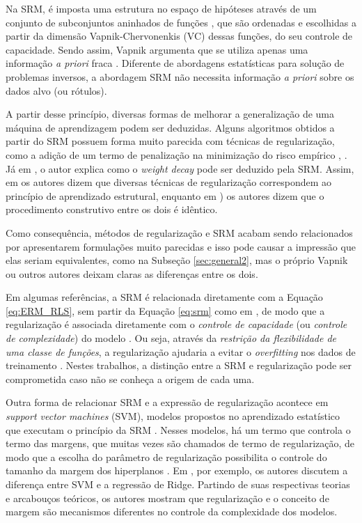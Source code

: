 Na SRM, é imposta uma estrutura no espaço de hipóteses através de um conjunto de subconjuntos aninhados de funções \cite[pág. 221]{vapnik1998statistical}, que são ordenadas e escolhidas a partir da dimensão Vapnik-Chervonenkis (VC) dessas funções, do seu controle de capacidade. Sendo assim, Vapnik argumenta que se utiliza apenas uma informação \textit{a priori} fraca \cite[pág. 702]{vapnik1998statistical}. Diferente de abordagens estatísticas para solução de problemas inversos, a abordagem SRM não necessita informação \textit{a priori} sobre os dados alvo (ou rótulos). 

A partir desse princípio, diversas formas de melhorar a generalização de uma máquina de aprendizagem podem ser deduzidas. Alguns algoritmos obtidos a partir do SRM possuem forma muito parecida com técnicas de regularização, como a adição de um termo de penalização na minimização do risco empírico \cite[pág. 2829]{Chen2002}, \cite[pág. 103]{alvarez2017digital}. Já em \cite[pág. 835]{Vapnik1992}, o autor explica como o \textit{weight decay} pode ser deduzido pela SRM. Assim, em \cite{Chen2002} os autores dizem que diversas técnicas de regularização correspondem ao princípio de aprendizado estrutural, enquanto em \cite[pág. 96-7]{cherkassky2007learning}) os autores dizem que o procedimento construtivo entre os dois é idêntico.

Como consequência, métodos de regularização e SRM acabam sendo relacionados por apresentarem formulações muito parecidas e isso pode causar a impressão que elas seriam equivalentes, como na Subseção \ref{sec:general2}, mas o próprio Vapnik \cite[págs. 421, 477]{Vapnik2006} ou outros autores \cite[págs. 968--9]{Cherkassky2009} deixam claras as diferenças entre os dois. 

 

Em algumas referências, a SRM é relacionada diretamente com a Equação \eqref{eq:ERM_RLS}, sem partir da Equação \eqref{eq:srm} como em \cite{Vapnik1992}, de modo que a regularização é associada diretamente com o \textit{controle de capacidade} (ou \textit{controle de complexidade}) do modelo \cite{Deisenroth2020, alvarez2017digital}. Ou seja, através da \textit{restrição da flexibilidade de uma classe de funções}, a regularização ajudaria a evitar o \textit{overfitting} nos dados de treinamento \cite{alvarez2017digital}. Nestes trabalhos, a distinção entre a SRM e regularização pode ser comprometida caso não se conheça a origem de cada uma. 

Outra forma de relacionar SRM e a expressão de regularização acontece em \textit{support vector machines} (SVM), modelos propostos no aprendizado estatístico que executam o princípio da SRM \cite[pág. 432]{Vapnik2006}. Nesses modelos, há um termo que controla o termo das margens, que muitas vezes são chamados de termo de regularização, de modo que a escolha do parâmetro de regularização possibilita o controle do tamanho da margem dos hiperplanos \cite[Seção 12.2.4]{Deisenroth2020}. Em \cite{Cherkassky2009}, por exemplo, os autores discutem a diferença entre SVM e a regressão de Ridge. Partindo de suas respectivas teorias e arcabouços teóricos, os autores mostram que regularização e o conceito de margem são mecanismos diferentes no controle da complexidade dos modelos.


